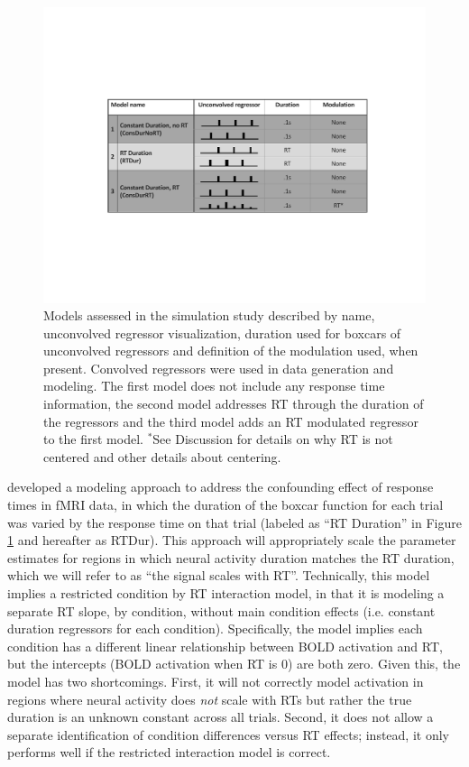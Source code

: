 \documentclass[titlepage,12pt] {article}
\begin{document}
\begin{figure}
  \centering
   \includegraphics[width=6in]{Figures/model_explainer_new.pdf}
   \caption{Models assessed in the simulation study described by name, unconvolved regressor visualization, duration used for boxcars of unconvolved regressors and definition of the modulation used, when present.  Convolved regressors were used in data generation and modeling.  The first model does not include any response time information, the second model addresses RT through the duration of the regressors and the third model adds an RT modulated regressor to the first model.  $^*$See Discussion for details on why RT is not centered and other details about centering.}
  \label{fig:models}
\end{figure}

\citet{grinband_detection_2008} developed a modeling approach to address the confounding effect of response times in fMRI data, in which the duration of the boxcar function for each trial was varied by the response time on that trial (labeled as ``RT Duration'' in Figure \ref{fig:models} and hereafter as RTDur).  This approach will appropriately scale the parameter estimates for regions in which neural activity duration matches the RT duration, which we will refer to as ``the signal scales with RT''.  Technically, this model implies a restricted condition by RT interaction model, in that it is modeling a separate RT slope, by condition, without main condition effects (i.e. constant duration regressors for each condition). Specifically, the model implies each condition has a different linear relationship between BOLD activation and RT, but the intercepts (BOLD activation when RT is 0) are both zero.  Given this, the model has two shortcomings. First, it will not correctly model activation in regions where neural activity does \textit{not} scale with RTs but rather the true duration is an unknown constant across all trials.  Second, it does not allow a separate identification of condition differences versus RT effects; instead, it only performs well if the restricted interaction model is correct.  
\end{document}

